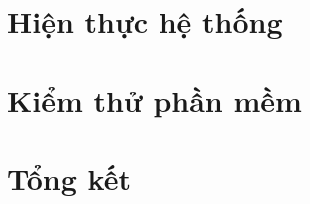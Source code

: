 \documentclass[a4paper, twoside, 12pt]{report}
\theoremstyle{definition}
\begin{document}
% 

% 
% 

% 

\newpage



% 


\chapter{Hiện thực hệ thống}


% 


\chapter{Kiểm thử phần mềm}



\chapter{Tổng kết}





\end{document}
